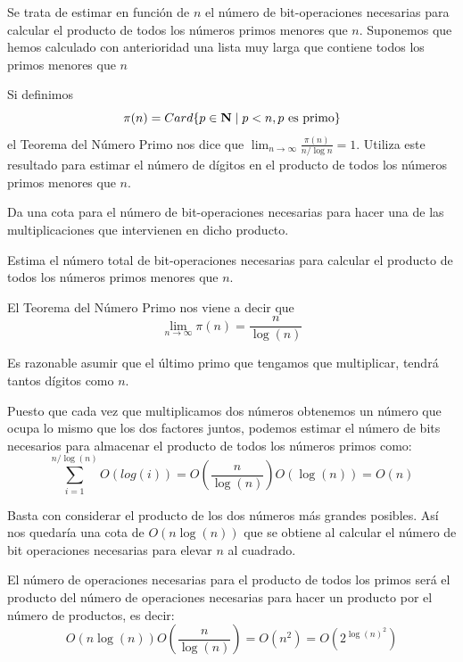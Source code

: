 \begin{problem}[10]
Se trata de estimar en función de $n$ el número de bit-operaciones
necesarias para calcular el producto de todos los números primos menores que
$n$. Suponemos que hemos calculado con anterioridad una lista muy larga que
contiene todos los primos menores que $n$

\ppart Si definimos
\[\pi(n)=Card\{p\in\bold N\mid p<n, p \text{ es primo}\}\]
el Teorema del Número Primo nos dice que \linebreak $\lim_{n \to \infty}\frac{\pi(n)}{n/\log
n}=1$. Utiliza este resultado para estimar el número de dígitos en el producto
de todos los números primos menores que $n$.

\ppart Da una cota para el número de bit-operaciones necesarias para hacer una de
las multiplicaciones que intervienen en dicho producto.

\ppart Estima  el número total de bit-operaciones
necesarias para calcular el producto de todos los números primos menores que
$n$.
\solution


\spart

El Teorema del Número Primo nos viene a decir que
\[\lim_{n\to \infty} π(n) = \frac{n}{\log(n)}\]

Es razonable asumir que el último primo que tengamos que multiplicar, tendrá tantos dígitos como $n$.

Puesto que cada vez que multiplicamos dos números obtenemos un número que ocupa lo mismo que los dos factores juntos, podemos estimar el número de bits necesarios para almacenar el producto de todos los números primos como:
\[\sum_{i=1}^{n/\log(n)}O(log(i)) = O\left( \frac{n}{\log(n)}\right) O(\log(n)) = O(n)\]

\spart

Basta con considerar el producto de los dos números más grandes posibles. Así nos quedaría una cota de $O(n\log(n))$ que se obtiene al calcular el número de bit operaciones necesarias para elevar $n$ al cuadrado.

\spart
El número de operaciones necesarias para el producto de todos los primos será el producto del número de operaciones necesarias para hacer un producto por el número de productos, es decir:
\[O(n \log(n))O\left(\frac{n}{\log(n)} \right) = O(n^2) = O\left(2^{\log(n)^2}\right)\]

\end{problem}


